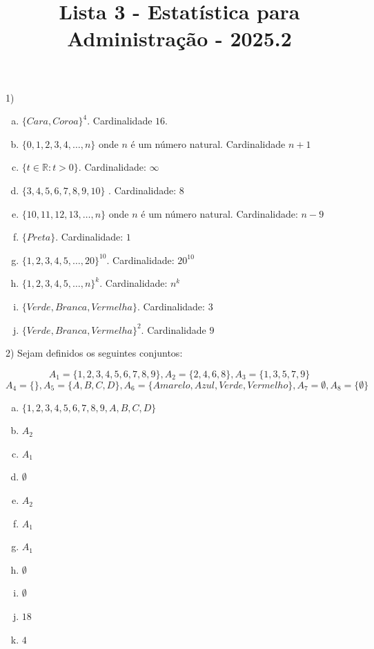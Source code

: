 \documentclass[12pt]{article}
\title{Lista 3 - Estatística para Administração - 2025.2}
\begin{document}
\date{}
\maketitle


1) 

\begin{enumerate}[a)]
    \item $\{Cara, Coroa\}^4$. Cardinalidade $16$.
    \item $\{0, 1, 2,3,4, \dots, n \}$ onde $n$ é um número natural. Cardinalidade $n+1$
    \item $\{t \in \mathbb{R}:t>0\}$. Cardinalidade: $\infty$
    \item $\{3,4,5,6,7,8,9,10\}$ . Cardinalidade: $8$
    \item $\{10, 11, 12, 13, \dots, n\}$ onde $n$ é um número natural. Cardinalidade: $n-9$
    \item $\{Preta\}$. Cardinalidade: $1$
    \item $\{1,2,3,4,5, \dots, 20\}^{10}$. Cardinalidade: $20^{10}$
    \item $\{1,2,3,4,5, \dots, n\}^k$. Cardinalidade: $n^k$
    \item $\{Verde, Branca, Vermelha\}$. Cardinalidade: $3$
    \item $\{Verde, Branca, Vermelha\}^2$. Cardinalidade $9$
\end{enumerate}

\vspace{5px}

2) Sejam definidos os seguintes conjuntos:

$$A_1 = \{1,2,3,4,5,6,7,8,9\}, A_2 = \{2, 4, 6, 8\}, A_3 = \{1, 3, 5, 7, 9\}$$
$$A_4 = \{\}, A_5 = \{A, B, C, D\}, A_6 = \{Amarelo, Azul, Verde, Vermelho\}, A_7 = \emptyset, A_8 = \{\emptyset\}$$

\begin{enumerate}[a)] %
    \item $\{1,2,3,4,5,6,7,8,9, A, B, C, D\}$ 
    \item $A_2$
    \item $A_1$
    \item $\emptyset$
    \item $A_2$
    \item $A_1$
    \item $A_1$
    \item $\emptyset$
    \item $\emptyset$
    \item $18$
    \item $4$
\end{enumerate}
\vspace{10px}
\end{document}
